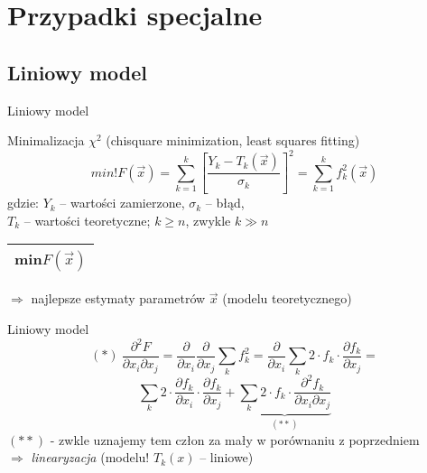 \section{Przypadki specjalne}

\subsection{Liniowy model}
  \begin{frame}{Liniowy model}
    \begin{block}{Minimalizacja $\chi^{2}$ (chisquare minimization, least squares fitting)}
      \begin{displaymath}
        min!F(\vec{x}) = \sum_{k=1}^{k} \left[ \frac{Y_{k} - T_{k}(\vec{x})}{\sigma_{k}} \right]^{2} = \sum_{k=1}^{k} f_{k}^{2}(\vec{x})
      \end{displaymath}
      gdzie: $Y_{k}$ -- wartości zamierzone, $\sigma_{k}$ -- błąd,\\
      $T_{k}$ -- wartości teoretyczne; $k \geq n$, zwykle $k \gg n$ \\
      \begin{tabular}{|c|} \hline
        min$F(\vec{x})$ \\ \hline
      \end{tabular}
      $\Rightarrow$ najlepsze estymaty parametrów $\vec{x}$
      (modelu teoretycznego)
    \end{block}

  \end{frame}

  \begin{frame}{Liniowy model}
    \begin{equation}
      (*)\ \frac{\partial^2 F}{\partial x_{i} \partial x_{j}} =
      \frac{\partial}{\partial x_{i}} \frac{\partial}{\partial x_{j}}
      \sum_{k} f_{k}^2 = \frac{\partial}{\partial x_{i}}
      \sum_{k} 2 \cdot f_{k} \cdot \frac{\partial f_{k}}{\partial x_{j}} =
      \nonumber
    \end{equation}
    \begin{equation}
      \sum_{k} 2 \cdot \frac{\partial f_{k}}{\partial x_{i}} \cdot
      \frac{\partial f_{k}}{\partial x_{j}} +
      \underbrace{
        \sum_{k} 2 \cdot f_{k} \cdot
        \frac{\partial^2 f_{k}}{\partial x_{i} \partial x_{j}}
      }_{(**)}
      \nonumber
    \end{equation}
    $(**)$ - zwkle uznajemy tem człon za mały w porównaniu
    z poprzedniem\\
    $\Rightarrow$ \emph{linearyzacja} (modelu! $T_{k}(x)$ -- liniowe)
  \end{frame}

